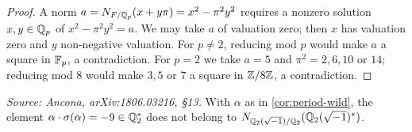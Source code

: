 \begin{proof}
  A norm \(a = N_{F/\mathbb{Q}_p}(x + y\pi) = x^2 - \pi^2 y^2\) requires a nonzero
  solution \(x, y \in \mathbb{Q}_p\) of \(x^2 - \pi^2 y^2 = a\). We may take \(a\) of
  valuation zero; then \(x\) has valuation zero and \(y\) non-negative
  valuation. For \(p \neq 2\), reducing mod \(p\) would make \(a\) a square in
  \(\mathbb{F}_p\), a contradiction. For \(p = 2\) we take \(a = 5\) and \(\pi^2 = 2, 6,
  10\) or \(14\); reducing mod \(8\) would make \(3, 5\) or \(7\) a square in
  \(\mathbb{Z}/8\mathbb{Z}\), a contradiction.
\end{proof}

\begin{lemma}[\(-9\) is not a norm, \(F = \Q_2(\sqrt{-1})\)]
  \label{lem:not-norm-wild}
  \textit{Source: Ancona, arXiv:1806.03216, \S13.}
  With \(\alpha\) as in \cref{cor:period-wild}, the element
  \(\alpha \cdot \sigma(\alpha) = -9 \in \mathbb{Q}_2^*\) does not belong to
  \(N_{\mathbb{Q}_2(\sqrt{-1})/\mathbb{Q}_2}(\mathbb{Q}_2(\sqrt{-1})^*)\).
\end{lemma}

